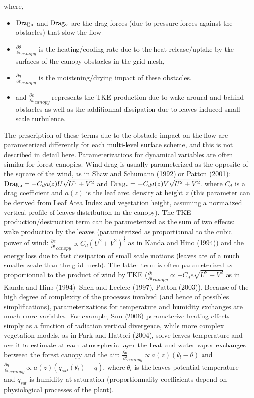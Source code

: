 where, 
\begin{itemize}
\item ${\rm Drag_u}$ and ${\rm Drag_v}$ are the drag forces (due to pressure forces against the obstacles) that slow the flow, 
\item $\frac{\partial \theta}{\partial t}_{canopy}$ is the heating/cooling rate due to the heat release/uptake by the surfaces of the canopy obstacles in the grid mesh, 
\item $\frac{\partial q}{\partial t}_{canopy}$ is the moistening/drying impact of these obstacles, 
\item and $\frac{\partial e}{\partial t}_{canopy}$ represents the TKE production due to wake around and behind obstacles as well as the additionnal dissipation due to leaves-induced small-scale turbulence.
\end{itemize}

The prescription of these terms due to the obstacle impact on the flow are parameterized differently for each multi-level surface scheme, and this is not described in detail here. Parameterizations for dynamical variables are often similar for forest canopies. Wind drag is usually parameterized as the opposite of the square of the wind, as in Shaw and Schumann (1992)\nocite{Shaw1992} or Patton \etal (2001)\nocite{Patton2001}:  ${\rm Drag_u}=- C_d a(z) U \sqrt{U^2+V^2}$ and ${\rm Drag_v}=- C_d a(z) V \sqrt{U^2+V^2}$, where $C_d$ is a drag coefficient and $a(z)$ is the leaf area density at height $z$ (this parameter can be derived from Leaf Area Index and vegetation height, assuming a normalized vertical profile of leaves distribution in the canopy). The TKE production/destruction term can be parameterized as the sum of two effects: wake production by the leaves (parameterized as proportionnal to the cubic power of wind: $\frac{\partial e}{\partial t}_{canopy} \propto C_d(U^2+V^2)^\frac{3}{2}$ as in Kanda and Hino (1994)\nocite{Kanda1994}) and the energy loss due to fast dissipation of small scale motions (leaves are of a much smaller scale than the grid mesh). The latter term is often parameterized as proportionnal to the product of wind by TKE ($\frac{\partial e}{\partial t}_{canopy} \propto -C_de\sqrt{U^2+V^2}$ as in Kanda and Hino (1994)\nocite{Kanda1994}, Shen and Leclerc (1997)\nocite{Shen1997}, Patton \etal (2003)\nocite{Patton2003}). Because of the high degree of complexity of the processes involved (and hence of possibles simplifications), parameterizations for temperature and humidity exchanges are much more variables. For example, Sun \etal (2006)\nocite{Sun2006} parameterize heating effects simply as a function of radiation vertical divergence, while more complex vegetation models, as in Park and Hattori (2004)\nocite{Park2004}, solve leaves temperature and use it to estimate at each atmospheric layer the heat and water vapor exchanges between the forest canopy and the air: $\frac{\partial \theta}{\partial t}_{canopy} \propto a(z) (\theta_l - \theta)$ and $\frac{\partial q}{\partial t}_{canopy} \propto a(z) (q_{sat}(\theta_l) - q)$, where $\theta_l$ is the leaves potential temperature and $q_{sat}$ is humidity at saturation (proportionnality coefficients depend on physiological processes of the plant).\\

